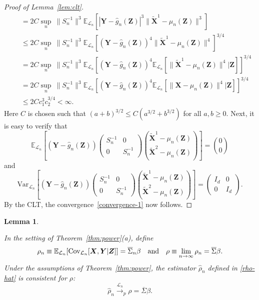 \documentclass[ejs]{imsart}
\numberwithin{equation}{section}
\theoremstyle{plain}
\newtheorem{lemma}{Lemma}
\theoremstyle{definition}
\theoremstyle{remark}
\newcommand{\prx}{\bm X}
\newcommand{\prz}{\bm Z}
\newcommand{\prxk}{{{\widetilde{\bm X}}}}
\newcommand{\pry}{{\bm Y}}
\begin{document}
\begin{proof}[Proof of Lemma~\ref{lem:clt}]
\begin{equation}
\begin{split}
			&\quad = 2C\sup_{n}\ \|S_n^{-1}\|^3 \mathbb E_{\mathcal L_n}\left[|\pry- \widehat g_n(\prz)|^3\|\prxk^1 - \mu_n(\prz)\|^3\right] \\
			&\quad \leq 2C\sup_{n}\ \|S_n^{-1}\|^3 \mathbb E_{\mathcal L_n}\left[(\pry- \widehat g_n(\prz))^4\|\prxk^1 - \mu_n(\prz)\|^4\right]^{3/4} \\
			&\quad = 2C\sup_{n}\ \|S_n^{-1}\|^3 \mathbb E_{\mathcal L_n}\left[(\pry- \widehat g_n(\prz))^4\mathbb E_{\mathcal L_n}[\|\prxk^1 - \mu_n(\prz)\|^4|\prz]\right]^{3/4} \\
			&\quad = 2C\sup_{n}\ \|S_n^{-1}\|^3 \mathbb E_{\mathcal L_n}\left[(\pry- \widehat g_n(\prz))^4\mathbb E_{\mathcal L_n}[\|\prx - \mu_n(\prz)\|^4|\prz]\right]^{3/4} \\
			&\quad \leq 2C c_1^3 c_2^{3/4} < \infty.
		\end{split}
	\end{equation}
	Here $C$ is chosen such that $(a+b)^{3/2} \leq C(a^{3/2} + b^{3/2})$ for all $a,b \geq 0$.
	Next, it is easy to verify that
	\begin{equation}
		\mathbb E_{\mathcal L_n}\left[(\pry - \widehat g_n(\prz))\begin{pmatrix}
			S_n^{-1} & 0 \\
			0 & S_n^{-1}
		\end{pmatrix}{\prxk^1 - \mu_n(\prz) \choose \prxk^2 - \mu_n(\prz)}\right] = {0 \choose 0}
	\end{equation}
	and
	\begin{equation}
		\text{Var}_{\mathcal L_n}\left[(\pry - \widehat g_n(\prz))\begin{pmatrix}
			S_n^{-1} & 0 \\
			0 & S_n^{-1}
		\end{pmatrix}{\prxk^1 - \mu_n(\prz) \choose \prxk^2 - \mu_n(\prz)}\right] = \begin{pmatrix}
			I_d & 0 \\
			0 & I_d
		\end{pmatrix}.
	\end{equation}
	By the CLT, the convergence~\eqref{convergence-1} now follows.
\end{proof}

\begin{lemma} \label{lem:consistency}

In the setting of Theorem~\ref{thm:power}(a), define 
\begin{equation*}
\rho_n \equiv \mathbb E_{\mathcal L_n}[\textnormal{Cov}_{\mathcal L_n}[\prx,\pry|\prz]] = \overline \Sigma_n \beta \quad \text{and} \quad \rho \equiv \lim_{n \rightarrow \infty} \rho_n = \overline \Sigma \beta.
\end{equation*}
Under the assumptions of Theorem~\ref{thm:power}, the estimator $\widehat \rho_n$ defined in \eqref{rho-hat} is consistent for $\rho$:
	\begin{equation}
	\widehat \rho_n \overset{\mathcal L_n}\rightarrow _p \rho = \overline \Sigma \beta.
	\label{eq:estimation-consistency}
\end{equation}

\end{lemma}
\end{document}
